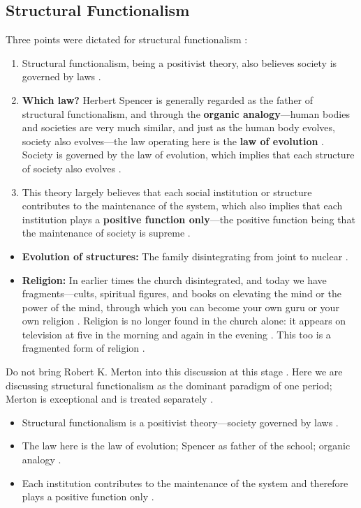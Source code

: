 \subsection{Structural Functionalism}
Three points were dictated for structural functionalism :
\begin{enumerate}
    \item Structural functionalism, being a positivist theory, also believes society is governed by laws .
    \item \textbf{Which law?} Herbert Spencer is generally regarded as the father of structural functionalism, and through the \textbf{organic analogy}---human bodies and societies are very much similar, and just as the human body evolves, society also evolves---the law operating here is the \textbf{law of evolution} . Society is governed by the law of evolution, which implies that each structure of society also evolves .
    \item This theory largely believes that each social institution or structure contributes to the maintenance of the system, which also implies that each institution plays a \textbf{positive function only}---the positive function being that the maintenance of society is supreme .
\end{enumerate}

\begin{ExampleBox}
\begin{itemize}
    \item \textbf{Evolution of structures:} The family disintegrating from joint to nuclear .
    \item \textbf{Religion:} In earlier times the church disintegrated, and today we have fragments---cults, spiritual figures, and books on elevating the mind or the power of the mind, through which you can become your own guru or your own religion . Religion is no longer found in the church alone: it appears on television at five in the morning and again in the evening . This too is a fragmented form of religion .
\end{itemize}
\end{ExampleBox}

\begin{CriticalPoint}
Do not bring Robert K. Merton into this discussion at this stage . Here we are discussing structural functionalism as the dominant paradigm of one period; Merton is exceptional and is treated separately .
\end{CriticalPoint}

\begin{QuickRevision}
\begin{itemize}
    \item Structural functionalism is a positivist theory---society governed by laws .
    \item The law here is the law of evolution; Spencer as father of the school; organic analogy .
    \item Each institution contributes to the maintenance of the system and therefore plays a positive function only .
\end{itemize}
\end{QuickRevision}

